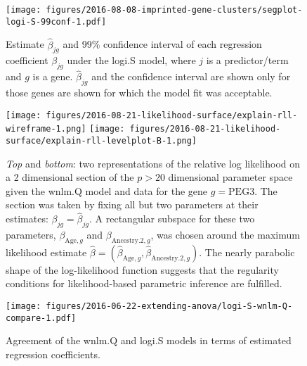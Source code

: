 \documentclass[letterpaper]{article}
\begin{document}
\begin{figure}
\begin{center}
\texttt{[image: figures/2016-08-08-imprinted-gene-clusters/segplot-logi-S-99conf-1.pdf]}
\end{center}
\caption{
Estimate \(\hat{\beta}_{jg}\) and 99\% confidence interval of each regression coefficient
\(\beta_{jg}\) under the logi.S model, where \(j\) is a predictor/term and
\(g\) is a gene.  \(\hat{\beta}_{jg}\) and the confidence interval are shown only for those
genes are shown for which the model fit was acceptable.
}
\label{fig:biol-effects-logi.S}
\end{figure}

\begin{figure}
\begin{center}
\texttt{[image: figures/2016-08-21-likelihood-surface/explain-rll-wireframe-1.png]}
\texttt{[image: figures/2016-08-21-likelihood-surface/explain-rll-levelplot-B-1.png]}
\end{center}
\caption{
\emph{Top} and \emph{bottom}: two representations of the relative log
likelihood on a 2 dimensional section of the \(p>20\) dimensional parameter
space given the wnlm.Q model and data for the gene \(g=\mathrm{PEG3}\).  The
section was taken by fixing all but two parameters at their estimates:
\(\beta_{jg} = \hat{\beta}_{jg}\).  A rectangular subspace for these two
parameters, \(\beta_{\mathrm{Age},g}\) and  \(\beta_{\mathrm{Ancestry.2},g}\),
was chosen around the maximum likelihood estimate \(\hat{\beta} =
(\hat{\beta}_{\mathrm{Age},g}, \hat{\beta}_{\mathrm{Ancestry.2},g})\).  The
nearly parabolic shape of the log-likelihood function suggests that the
regularity conditions for likelihood-based parametric inference are fulfilled.
}
\label{fig:ll-surf-explain}
\end{figure}

\begin{figure}
\begin{center}
\texttt{[image: figures/2016-06-22-extending-anova/logi-S-wnlm-Q-compare-1.pdf]}
\end{center}
\caption{
Agreement of the wnlm.Q and logi.S models in terms of estimated regression
coefficients.
}
\label{fig:logi.S-wnlm.Q-compare}
\end{figure}
\end{document}
